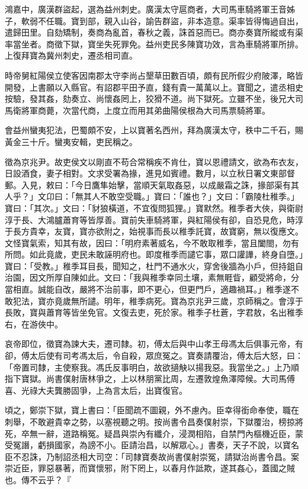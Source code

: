 \begin{pinyinscope}
鴻嘉中，廣漢群盜起，選為益州刺史。廣漢太守扈商者，大司馬車騎將軍王音姊子，軟弱不任職。寶到部，親入山谷，諭告群盜，非本造意。渠率皆得悔過自出，遣歸田里。自劾矯制，奏商為亂首，春秋之義，誅首惡而已。商亦奏寶所縱或有渠率當坐者。商徵下獄，寶坐失死罪免。益州吏民多陳寶功效，言為車騎將軍所排。上復拜寶為冀州刺史，遷丞相司直。

時帝舅紅陽侯立使客因南郡太守李尚占墾草田數百頃，頗有民所假少府陂澤，略皆開發，上書願以入縣官。有詔郡平田予直，錢有貴一萬萬以上。寶聞之，遣丞相史按驗，發其姦，劾奏立、尚懷姦罔上，狡猾不道。尚下獄死。立雖不坐，後兄大司馬衛將軍商薨，次當代商，上度立而用其弟曲陽侯根為大司馬票騎將軍。

會益州蠻夷犯法，巴蜀頗不安，上以寶著名西州，拜為廣漢太守，秩中二千石，賜黃金三十斤。蠻夷安輯，吏民稱之。

徵為京兆尹。故吏侯文以剛直不苟合常稱疾不肯仕，寶以恩禮請文，欲為布衣友，日設酒食，妻子相對。文求受署為掾，進見如賓禮。數月，以立秋日署文東部督郵。入見，敕曰：「今日鷹隼始擊，當順天氣取姦惡，以成嚴霜之誅，掾部渠有其人乎？」文卬曰：「無其人不敢空受職。」寶曰：「誰也？」文曰：「霸陵杜稚季。」寶曰：「其次。」文曰：「豺狼橫道，不宜復問狐狸。」寶默然。稚季者大俠，與衛尉淳于長、大鴻臚蕭育等皆厚善。寶前失車騎將軍，與紅陽侯有卻，自恐見危，時淳于長方貴幸，友寶，寶亦欲附之，始視事而長以稚季託寶，故寶窮，無以復應文。文怪寶氣索，知其有故，因曰：「明府素著威名，今不敢取稚季，當且闔閤，勿有所問。如此竟歲，吏民未敢誣明府也。即度稚季而譴它事，眾口讙譁，終身自墮。」寶曰：「受教。」稚季耳目長，聞知之，杜門不通水火，穿舍後牆為小戶，但持鉏自治園，因文所厚自陳如此。文曰：「我與稚季幸同土壤，素無睚眥，顧受將命，分當相直。誠能自改，嚴將不治前事，即不更心，但更門戶，適趣禍耳。」稚季遂不敢犯法，寶亦竟歲無所譴。明年，稚季病死。寶為京兆尹三歲，京師稱之。會淳于長敗，寶與蕭育等皆坐免官。文復去吏，死於家。稚季子杜蒼，字君敖，名出稚季右，在游俠中。

哀帝即位，徵寶為諫大夫，遷司隸。初，傅太后與中山孝王母馮太后俱事元帝，有卻，傅太后使有司考馮太后，令自殺，眾庶冤之。寶奏請覆治，傅太后大怒，曰：「帝置司隸，主使察我。馮氏反事明白，故欲擿觖以揚我惡。我當坐之。」上乃順指下寶獄。尚書僕射唐林爭之，上以林朋黨比周，左遷敦煌魚澤障候。大司馬傅喜、光祿大夫龔勝固爭，上為言太后，出寶復官。

頃之，鄭崇下獄，寶上書曰：「臣聞疏不圖親，外不慮內。臣幸得銜命奉使，職在刺舉，不敢避貴幸之勢，以塞視聽之明。按尚書令昌奏僕射崇，下獄覆治，榜掠將死，卒無一辭，道路稱冤。疑昌與崇內有纖介，浸潤相陷，自禁門內樞機近臣，蒙受冤譖，虧損國家，為謗不小。臣請治昌，以解眾心。」書奏，天子不說，以寶名臣不忍誅，乃制詔丞相大司空：「司隸寶奏故尚書僕射崇冤，請獄治尚書令昌。案崇近臣，罪惡暴著，而寶懷邪，附下罔上，以春月作詆欺，遂其姦心，蓋國之賊也。傳不云乎？『


\end{pinyinscope}
